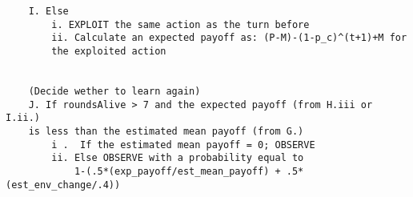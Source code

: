 \documentclass[11pt]{article}
\begin{document}
\begin{verbatim}
	I. Else 
		i. EXPLOIT the same action as the turn before
		ii. Calculate an expected payoff as: (P-M)-(1-p_c)^(t+1)+M for 
		the exploited action
	

	(Decide wether to learn again)
	J. If roundsAlive > 7 and the expected payoff (from H.iii or I.ii.) 
	is less than the estimated mean payoff (from G.)
		i .  If the estimated mean payoff = 0; OBSERVE
		ii. Else OBSERVE with a probability equal to 
		    1-(.5*(exp_payoff/est_mean_payoff) + .5*(est_env_change/.4))

\end{verbatim}
\end{document}
